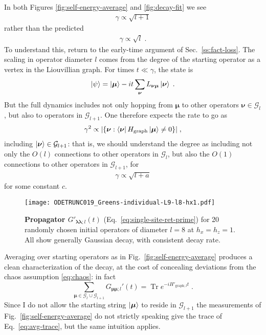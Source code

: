\documentclass[aps,prb,nofootinbib,twocolumn,balancelastpage,amsmath,amssymb,floatfix,superscriptaddress,]{revtex4-1}
\newcommand{\tr}{\operatorname{Tr}}
\newcommand{\graph}{\mathrm{graph}}
\newcommand{\pool}{\mathcal G}
\begin{document}
{In both Figures \ref{fig:self-energy-average} and \ref{fig:decay-fit} we see
\begin{align}
  \gamma \propto \sqrt{l+1}
\end{align}
rather than the predicted
\begin{align}
  \gamma \propto \sqrt{l}\;.
\end{align}
To understand this, return to the early-time argument of Sec.~\ref{ss:fact-loss}.
The scaling in operator diameter $l$ comes from the degree of the starting operator as a vertex in the Liouvillian graph.
For times $t \ll \gamma$, the state is
\begin{align}
  \ket \psi = \ket{\bm\mu} - it \sum_{\bm \nu} L_{\bm\nu\bm\mu}\ket{\bm \nu}\;.
\end{align}
But the full dynamics includes not only hopping from $\bm \mu$ to other operators $\bm \nu \in \pool_l$,
but also to operators in $\pool_{l+1}$.
One therefore expects the rate to go as
\begin{align}
  \gamma^2 \propto | \{\bm \nu : \bra {\bm \nu} H_\graph \ket{\bm \mu} \ne 0 \}|\;,
\end{align}
including $\ket{\bm \nu} \in \pool_{l+1}$:
that is, we should understand the degree as including not only the $O(l)$ connections to other operators in $\pool_l$,
but also the $O(1)$ connections to other operators in $\pool_{l+1}$, for
\begin{align}
  \gamma \propto \sqrt{l+a}
\end{align}
for some constant $c$.

\begin{figure}[t]
  \texttt{[image: ODETRUNC019\_Greens-individual-L9-l8-hx1.pdf]}
  \caption{\textbf{Propagator $G'_{\bm \lambda\bm\lambda;l}(t)$}  (Eq.~\eqref{eq:single-site-ret-prime}) for 20 randomly chosen initial operators of diameter $l = 8$
     at $h_x = h_z = 1$.
    All show generally Gaussian decay, with consistent decay rate. }
  \label{fig:self-energy-individual}
\end{figure}

Averaging over starting operators as in Fig.~\ref{fig:self-energy-average} produces a clean characterization of the decay,
at the cost of concealing deviations from the chaos assumption \eqref{eq:chaos}:
in fact
\begin{equation}
  \label{eq:avg-trace}
  \sum_{\bm \mu \in \pool_l \cup \pool_{l+1} } G_{\bm \mu\bm \mu;l}'(t) = \tr e^{-iH'_{\graph;l} t}\;.
\end{equation}
Since I do not allow the starting string $\ket{\bm\mu}$ to reside in $\pool_{l+1}$
the measurements of Fig.~\ref{fig:self-energy-average} do not strictly speaking give the trace of Eq.~\eqref{eq:avg-trace},
but the same intuition applies.
  
}
\end{document}
